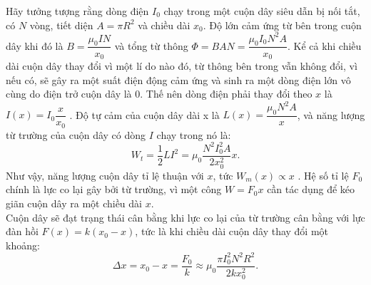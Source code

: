 \begin{vd}
\begin{center}

\end{center}
\end{vd}
\begin{loigiai}\[\]
Hãy tưởng tượng rằng dòng điện $I_0$ chạy trong một cuộn dây siêu dẫn bị nối tắt, có $N$ vòng, tiết diện $ A=\pi{R^2}$ và chiều dài $x_0$. Độ lớn cảm ứng từ bên trong cuộn dây khi đó là $ B=\dfrac{\mu_0IN}{x_0}$ và tổng từ thông $\Phi=BAN=\dfrac{\mu_0I_0N^2A}{x_0}$. Kể cả khi chiều dài cuộn dây thay đổi vì một lí do nào đó, từ thông bên trong vẫn không đổi, vì nếu có, sẽ gây ra một suất điện động cảm ứng và sinh ra một dòng điện lớn vô cùng do điện trở cuộn dây là $0$. Thế nên dòng điện phải thay đổi theo $x$ là $I(x)=I_0\dfrac{x}{x_0}$ . Độ tự cảm của cuộn dây dài x là $ L(x)=\dfrac{\mu_0N^2A}{x}$, và năng lượng từ trường của cuộn dây có dòng $I$ chạy trong nó là:
$${W}_t=\dfrac{1}{2}L{I^2}=\mu_0\dfrac{N^2I_0^2A}{2x_0^2}x.$$
Như vậy, năng lượng cuộn dây tỉ lệ thuận với $x$, tức ${W}_m(x)\propto x$ . Hệ số tỉ lệ $F_0$ chính là lực co lại gây bởi từ trường, vì một công ${W}=F_0x$ cần tác dụng để kéo giãn cuộn dây ra một chiều dài $x$.\\
Cuộn dây sẽ đạt trạng thái cân bằng khi lực co lại của từ trường cân bằng với lực đàn hồi $ F(x)=k\left(x_0-x\right)$, tức là khi chiều dài cuộn dây thay đổi một khoảng:
$$\Delta x=x_0-x=\dfrac{F_0}{k}\approx{\mu_0}\dfrac{\pi I_0^2N^2R^2}{2kx_0^2}.$$
\end{loigiai}


